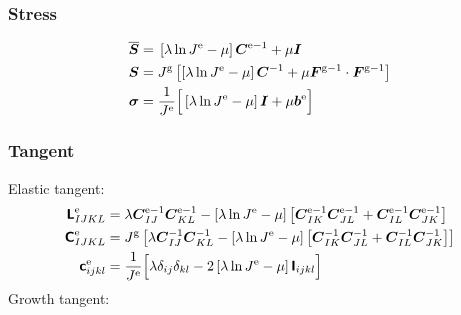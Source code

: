 \documentclass[10pt,letterpaper,oneside]{report}
\newcommand{\ten}[1]{\mbox{\boldmath $#1$}{}}
\newcommand{\tenf}[1]{\mbox{{\sffamily{\bfseries {#1}}}}}
\newcommand{\scas}[1]{\mbox{{\scriptsize{${\rm{#1}}$}}}{}}
\begin{document}
\subsubsection{Stress}
\begin{align}
\overline{\ten{S}} ={}& \left[ \lambda \ln J^{\scas{e}} - \mu \right] \ten{C}^{\scas{e}-1} + \mu \ten{I} 
\\
\ten{S} ={}& J^{\scas{g}} \left[ \left[ \lambda \ln J^{\scas{e}} - \mu \right] \ten{C}^{-1} + \mu \ten{F}^{\scas{g}-1} \cdot \ten{F}^{\scas{g}-1} \right] 
\\
\ten{\sigma} ={}& \frac{1}{J^{\scas{e}}} \Big[ \left[ \lambda \ln J^{\scas{e}} - \mu \right] \ten{I} + \mu \ten{b}^{\scas{e}} \Big]
\end{align}

\subsubsection{Tangent}
Elastic tangent:
\begin{align}
\tenf{L}^{\scas{e}}_{IJKL} ={}& \lambda \ten{C}^{\scas{e}-1}_{IJ} \ten{C}^{\scas{e}-1}_{KL} - \left[ \lambda \ln J^{\scas{e}} - \mu \right] \left[ \ten{C}^{\scas{e}-1}_{IK} \ten{C}^{\scas{e}-1}_{JL} + \ten{C}^{\scas{e}-1}_{IL} \ten{C}^{\scas{e}-1}_{JK} \right] 
\\
\tenf{C}^{\scas{e}}_{IJKL} ={}& J^{\scas{g}} \left[ \lambda \ten{C}^{-1}_{IJ} \ten{C}^{-1}_{KL} - \left[ \lambda \ln J^{\scas{e}} - \mu \right] \left[ \ten{C}^{-1}_{IK} \ten{C}^{-1}_{JL} + \ten{C}^{-1}_{IL} \ten{C}^{-1}_{JK} \right] \right]  
\\
\tenf{c}^{\scas{e}}_{ijkl} ={}& \frac{1}{J^{\scas{e}}} \Big[ \lambda \delta_{ij} \delta_{kl} - 2 \left[ \lambda \ln J^{\scas{e}} - \mu \right] \tenf{I}_{ijkl} \Big]
\end{align}
Growth tangent:
\end{document}
